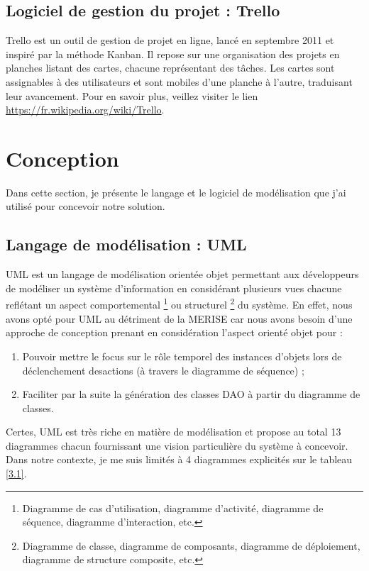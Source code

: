 \subsection{Logiciel de gestion du projet : Trello}
Trello est un outil de gestion de projet en ligne, lancé en septembre 2011 et inspiré par la méthode Kanban. Il repose sur une organisation des projets en planches listant des cartes, chacune représentant des tâches. Les cartes sont assignables à des utilisateurs et sont mobiles d'une planche à l'autre, traduisant leur avancement. Pour en savoir plus, veillez visiter le lien \href{https://fr.wikipedia.org/wiki/Trello}{https://fr.wikipedia.org/wiki/Trello}.

\section{Conception}
Dans cette section, je présente le langage et le logiciel de modélisation que j'ai utilisé pour concevoir notre solution.

\subsection{Langage de modélisation : UML}
UML est un langage de modélisation orientée objet permettant aux développeurs de modéliser un système d’information en considérant plusieurs vues chacune reflétant un aspect comportemental \footnote{Diagramme de cas d’utilisation, diagramme d’activité, diagramme de séquence, diagramme d’interaction, etc.} ou structurel \footnote{Diagramme de classe, diagramme de composants, diagramme de déploiement, diagramme de structure composite, etc.} du système.
\newline
En effet, nous avons opté pour UML au détriment de la MERISE car nous avons besoin
d’une approche de conception prenant en considération l’aspect orienté objet pour :
\begin{enumerate}
	\item Pouvoir mettre le focus sur le rôle temporel des instances d’objets lors de déclenchement desactions (à travers le diagramme de séquence) ;
	\item Faciliter par la suite la génération des classes DAO à partir du diagramme de classes.
\end{enumerate}
Certes, UML est très riche en matière de modélisation et propose au total 13 diagrammes chacun fournissant une vision particulière du système à concevoir. Dans notre contexte, je me suis limités à 4 diagrammes explicités sur le tableau \ref{3.1}.

